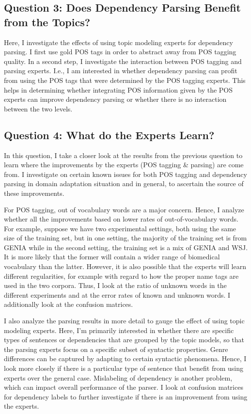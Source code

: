 \subsection*{Question 3: Does Dependency Parsing Benefit from the Topics?}

Here, I investigate the effects of using topic modeling experts for dependency parsing. I first use gold POS tags in order to abstract away from POS tagging quality. In a second step, I investigate the interaction between POS tagging and parsing experts. I.e., I am interested in whether dependency parsing can profit from using the POS tags that were determined by the POS tagging experts. This helps in determining whether integrating POS information given by the POS experts can improve dependency parsing or whether there is no interaction between the two levels.

\subsection*{Question 4: What do the Experts Learn?}

In this question, I take a closer look at the results from the previous question to learn where the improvements by the experts (POS tagging \& parsing) are come from. I investigate on certain known issues for both POS tagging and dependency parsing in domain adaptation situation and in general, to ascertain the source of these improvements. 

For POS tagging, out of vocabulary words are a major concern. Hence, I analyze whether all the improvements based on lower rates of out-of-vocabulary words. For example, suppose we have two experimental settings, both using the same size of the training set, but in one setting, the majority of the training set is from GENIA while in the second setting, the training set is a mix of GENIA and WSJ. It is more likely that the former will contain a wider range of biomedical vocabulary than the latter. However, it is also possible that the experts will learn different regularities, for example with regard to how the proper name tags are used in the two corpora. Thus, I look at the ratio of unknown words in the different experiments and at the error rates of known and unknown words. I additionally look at the confusion matrices.

I also analyze the parsing results in more detail to gauge the effect of using topic modeling experts. Here, I'm primarily interested in whether there are specific types of sentences or dependencies that are grouped by the topic models, so that the parsing experts focus on a specific subset of syntactic properties. Genre differences can be captured by adapting to certain syntactic phenomena. Hence, I look more closely if there is a particular type of sentence that benefit from using experts over the general case. Mislabeling of dependency is another problem, which can impact overall performance of the parser. I look at confusion matrices for dependency labels to further investigate if there is an improvement from using the experts. 

